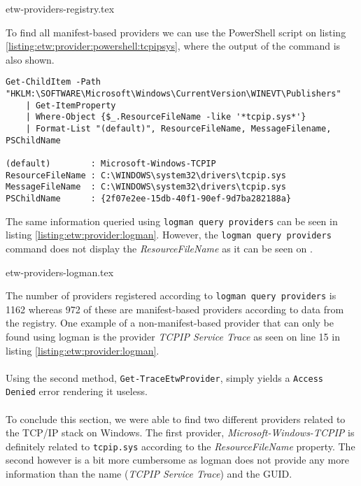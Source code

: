 \documentclass{report}
\begin{document}
{etw-providers-registry.tex}

To find all manifest-based providers we can use the PowerShell script on listing \ref{listing:etw:provider:powershell:tcpipsys}, where the output of the command is also shown.

\begin{listing}[H]
\begin{verbatim}
Get-ChildItem -Path "HKLM:\SOFTWARE\Microsoft\Windows\CurrentVersion\WINEVT\Publishers"
    | Get-ItemProperty
    | Where-Object {$_.ResourceFileName -like '*tcpip.sys*'}
    | Format-List "(default)", ResourceFileName, MessageFilename, PSChildName

(default)        : Microsoft-Windows-TCPIP
ResourceFileName : C:\WINDOWS\system32\drivers\tcpip.sys
MessageFileName  : C:\WINDOWS\system32\drivers\tcpip.sys
PSChildName      : {2f07e2ee-15db-40f1-90ef-9d7ba282188a}
\end{verbatim}
\caption{\texttt{logman query providers} output. See appendix \ref{appendix:etw-providers} for full output}
\label{listing:etw:provider:powershell:tcpipsys}
\end{listing}

The same information queried using \texttt{logman query providers} can be seen in listing \ref{listing:etw:provider:logman}. However, the \texttt{logman query providers} command does not display the \emph{ResourceFileName} as it can be seen on .

{etw-providers-logman.tex}

The number of providers registered according to \texttt{logman query providers} is 1162 whereas 972 of these are manifest-based providers according to data from the registry. One example of a non-manifest-based provider that can only be found using logman is the provider \emph{TCPIP Service Trace} as seen on line 15 in listing \ref{listing:etw:provider:logman}.
\\
\\
Using the second method, \texttt{Get-TraceEtwProvider}, simply yields a \texttt{Access Denied} error rendering it useless.
\\
\\
To conclude this section, we were able to find two different providers related to the TCP/IP stack on Windows. The first provider, \emph{Microsoft-Windows-TCPIP} is definitely related to \texttt{tcpip.sys} according to the \emph{ResourceFileName} property. The second however is a bit more cumbersome as logman does not provide any more information than the name (\emph{TCPIP Service Trace}) and the GUID.
\end{document}
